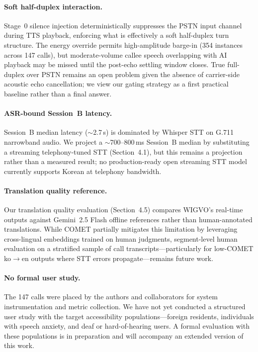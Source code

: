 \documentclass[11pt]{article}
\begin{document}
\paragraph{Soft half-duplex interaction.}
Stage~0 silence injection deterministically suppresses the PSTN
input channel during TTS playback, enforcing what is effectively
a soft half-duplex turn structure. The energy override permits
high-amplitude barge-in (354 instances across 147 calls), but
moderate-volume callee speech overlapping with AI playback may
be missed until the post-echo settling window closes. True
full-duplex over PSTN remains an open problem given the absence
of carrier-side acoustic echo cancellation; we view our gating
strategy as a first practical baseline rather than a final answer.

\paragraph{ASR-bound Session~B latency.}
Session~B median latency ($\sim$2.7\,s) is dominated by Whisper
STT on G.711 narrowband audio. We project a $\sim$700--800\,ms
Session~B median by substituting a streaming telephony-tuned STT
(Section~4.1), but this remains a projection rather than a
measured result; no production-ready open streaming STT model
currently supports Korean at telephony bandwidth.

\paragraph{Translation quality reference.}
Our translation quality evaluation (Section~4.5) compares
WIGVO's real-time outputs against Gemini~2.5 Flash offline
references rather than human-annotated translations. While
COMET partially mitigates this limitation by leveraging
cross-lingual embeddings trained on human judgments,
segment-level human evaluation on a stratified sample of
call transcripts---particularly for low-COMET ko$\to$en
outputs where STT errors propagate---remains future work.

\paragraph{No formal user study.}
The 147 calls were placed by the authors and collaborators
for system instrumentation and metric collection. We have
not yet conducted a structured user study with the target
accessibility populations---foreign residents, individuals
with speech anxiety, and deaf or hard-of-hearing users.
A formal evaluation with these populations is in preparation
and will accompany an extended version of this work.
\end{document}
